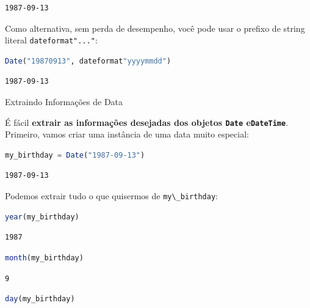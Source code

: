 \documentclass[
  notoc %
]{tufte-book}
\makeatletter
\newcommand{\passthrough}[1]{#1}
\renewcommand\subsubsection{%
\@startsection{subsubsection}{3}{\z@ }{-3.25ex\@plus -1ex \@minus -.2ex}{1.5ex \@plus .2ex}{\normalfont \normalsize \bfseries }
}
\makeatother
\begin{document}
\begin{lstlisting}[language=Output]
1987-09-13
\end{lstlisting}

Como alternativa, sem perda de desempenho, você pode usar o prefixo de
string literal \passthrough{\lstinline!dateformat"..."!}:

\begin{lstlisting}[language=Julia]
Date("19870913", dateformat"yyyymmdd")
\end{lstlisting}

\begin{lstlisting}[language=Output]
1987-09-13
\end{lstlisting}

\hypertarget{sec:dates_information}{%
\subsubsection{Extraindo Informações de
Data}\label{sec:dates_information}}

É fácil \textbf{extrair as informações desejadas dos objetos
\passthrough{\lstinline!Date!} e\passthrough{\lstinline!DateTime!}}.
Primeiro, vamos criar uma instância de uma data muito especial:

\begin{lstlisting}[language=Julia]
my_birthday = Date("1987-09-13")
\end{lstlisting}

\begin{lstlisting}[language=Output]
1987-09-13
\end{lstlisting}

Podemos extrair tudo o que quisermos de
\passthrough{\lstinline!my\_birthday!}:

\begin{lstlisting}[language=Julia]
year(my_birthday)
\end{lstlisting}

\begin{lstlisting}[language=Output]
1987
\end{lstlisting}

\begin{lstlisting}[language=Julia]
month(my_birthday)
\end{lstlisting}

\begin{lstlisting}[language=Output]
9
\end{lstlisting}

\begin{lstlisting}[language=Julia]
day(my_birthday)
\end{lstlisting}
\end{document}
